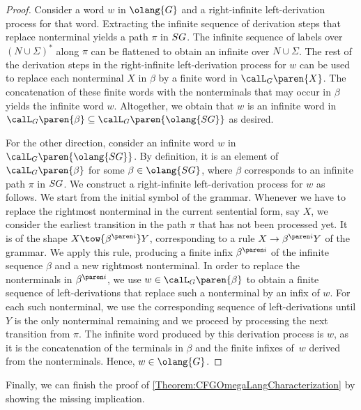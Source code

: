 \documentclass[../../diss.tex]{subfiles}
\begin{document}
\begin{proof}
    Consider a word $w$ in $\olang{G}$ and a right-infinite left-derivation process for that word.
    Extracting the infinite sequence of derivation steps that replace nonterminal yields a path $\pi$ in $SG$.
    The infinite sequence of labels over ${(N \cup \Sigma)}^*$ along $\pi$ can be flattened to obtain an infinite  over $N \cup \Sigma$.
    The rest of the derivation steps in the right-infinite left-derivation process for $w$ can be used to replace each nonterminal $X$ in $\beta$ by a finite word in $\calL_G\paren{X}$.
    The concatenation of these finite words with the nonterminals that may occur in $\beta$ yields the infinite word $w$.
    Altogether, we obtain that $w$ is an infinite word in $\calL_G\paren{\beta} \subseteq \calL_G\paren{\olang{\SpinalGraph}}$ as desired.

    For the other direction, consider an infinite word $w$ in $\calL_G\paren{\olang{\SpinalGraph}}$.
    By definition, it is an element of $\calL_G\paren{\beta}$ for some $\beta \in \olang{\SpinalGraph}$, where $\beta$ corresponds to an infinite path $\pi$ in $SG$.
    We construct a right-infinite left-derivation process for $w$ as follows.
    We start from the initial symbol of the grammar.
    Whenever we have to replace the rightmost nonterminal in the current sentential form, say $X$, we consider the earliest transition in the path $\pi$ that has not been processed yet.
    It is of the shape $X \tow{\itr{\beta}{i}} Y$, corresponding to a rule $X \to \itr{\beta}{i}Y$ of the grammar.
    We apply this rule, producing a finite infix $\itr{\beta}{i}$ of the infinite sequence $\beta$ and a new rightmost nonterminal.
    In order to replace the nonterminals in $\itr{\beta}{i}$, we use $w \in \calL_G\paren{\beta}$ to obtain a finite sequence of left-derivations that replace such a nonterminal by an infix of $w$.
    For each such nonterminal, we use the corresponding sequence of left-derivations until $Y$ is the only nonterminal remaining and we proceed by processing the next transition from $\pi$.
    The infinite word produced by this derivation process is $w$, as it is the concatenation of the terminals in $\beta$ and the finite infixes of~$w$ derived from the nonterminals.
    Hence, $w \in \olang{G}$.
\end{proof}

Finally, we can finish the proof of \cref{Theorem:CFGOmegaLangCharacterization}
by showing the missing implication.
\end{document}
